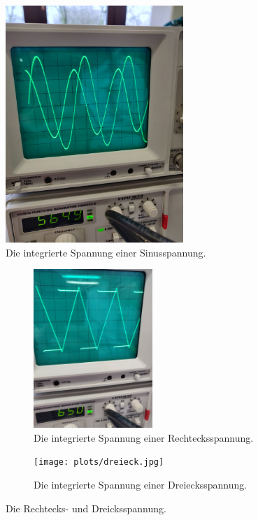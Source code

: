 \begin{figure}
    \centering
    \includegraphics[angle=-90,width=0.6\textwidth]{plots/sinus.jpg}
    \caption{Die integrierte Spannung einer Sinusspannung.}
    \label{fig:int_sinus}
\end{figure}

\begin{figure}
    \centering
    \begin{subfigure}{0.48\textwidth}
        \centering
        \includegraphics[height=6cm,angle=-90]{plots/rechteck.jpg}
        \caption{Die integrierte Spannung einer Rechtecksspannung.}
        \label{fig:int_rechteck}
    \end{subfigure}
    \begin{subfigure}{0.48\textwidth}
        \centering
        \texttt{[image: plots/dreieck.jpg]}
        \caption{Die integrierte Spannung einer Dreiecksspannung.}
        \label{fig:int_dreieck}
    \end{subfigure}
    \caption{Die Rechtecks- und Dreicksspannung.}
    \label{fig:rechtdrei}
\end{figure}
